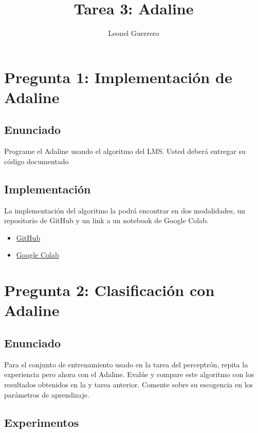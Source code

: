 \documentclass{article}
\title{Tarea 3: Adaline}
\author{Leonel Guerrero}
\theoremstyle{mytheoremstyle}
\theoremstyle{mytheoremstyle}
\theoremstyle{myproblemstyle}
\begin{document}
\maketitle

\section*{Pregunta 1: Implementación de Adaline}

\subsection*{Enunciado}

Programe el Adaline usando el algoritmo del LMS. Usted deberá entregar su código documentado

\subsection*{Implementación}

La implementación del algoritmo la podrá encontrar en dos modalidades, un repositorio de GitHub y un link a un notebook de Google Colab.

\begin{itemize}
  \item \href{https://github.com/LeoGCode/Tarea-3--Adeline/tree/master}{GitHub}
  \item \href{https://colab.research.google.com/drive/1tJQTJQ7CsmHIKHYfZTUcK848-medrgmL?usp=sharing}{Google Colab}
\end{itemize}

\section*{Pregunta 2: Clasificación con Adaline}

\subsection*{Enunciado}

Para el conjunto de entrenamiento usado en la tarea del perceptrón, repita la experiencia pero ahora con el Adaline. Evalúe y compare este algoritmo con los resultados obtenidos en la y tarea anterior. Comente sobre su escogencia en los parámetros de aprendizaje.

\subsection*{Experimentos}
\end{document}
